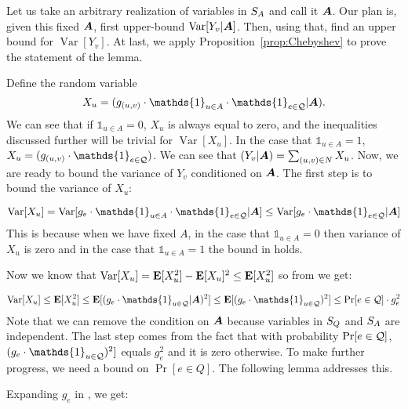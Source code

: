 \documentclass[letterpaper,11pt]{article}
\DeclareMathOperator{\E}{\ensuremath{\normalfont \textbf{E}}}
\DeclareMathOperator{\var}{Var}
\begin{document}
Let us take an arbitrary realization of variables in $S_A$ and call it $\bm{A}$. Our plan is, given this fixed $\bm{A}$, first upper-bound $\var[Y_v | \Aset]$. Then, using that, find an upper bound for $\var[Y_v]$. At last, we apply Proposition~\ref{prop:Chebyshev} to prove the statement of the lemma.


Define the random variable $$X_u = (g_{(u, v)} \cdot \mathds{1}_{u \in A} \cdot \mathds{1}_{e \in \qstar} | \Aset).$$ We can see that if $\mathds{1}_{u \in A} = 0$, $X_u$ is always equal to zero, and the inequalities discussed further will be trivial for $\var[X_u]$. In the case that $\mathds{1}_{u \in A} = 1$, $X_u = (g_{(u, v)} \cdot \mathds{1}_{e \in \qstar})$. We can see that $(Y_v | \bm{A}) = \sum_{(u, v) \in N} X_u$. Now, we are ready to bound the variance of $Y_v$ conditioned on $\bm{A}$. The first step is to bound the variance of $X_u$: 

\begin{equation}\label{eq:var_1}
\var[X_u] = \var[ g_{e} \cdot \mathds{1}_{u\in A} \cdot \mathds{1}_{e\in \qstar} | \Aset] \leq \var[ g_{e} \cdot \mathds{1}_{e\in \qstar} | \Aset]
\end{equation}
This is because when we have fixed $A$, in the case that $\mathds{1}_{u\in A} = 0$ then variance of $X_u$ is zero and in the case that $\mathds{1}_{u\in A} = 1$ the bound in  holds. 

Now we know that $\var[X_u] = \E[X_u^2] - \E[X_u]^2 \leq \E[X_u^2]$ so from  we get: 

\begin{equation}\label{eq:var_2}
\var[X_u] \leq \E[X_u^2] \leq \E[(g_e \cdot \mathds{1}_{u\in \qstar} | \Aset)^2] \leq \E[(g_e \cdot \mathds{1}_{u\in \qstar})^2] \leq 
\Pr[e \in \qstar] \cdot g_e^2
\end{equation}
Note that we can remove the condition on $\bm{A}$ because variables in $S_Q$ and $S_A$ are independent. The last step comes from the fact that with probability $\Pr[e \in \mathcal{Q}]$, $(g_e \cdot \mathds{1}_{u\in \qstar})^2]$ equals $g_e^2$ and it is zero otherwise. To make further progress, we need a bound on $\Pr[e\in Q]$. The following lemma addresses this.



Expanding $g_e$ in , we get:
\end{document}

